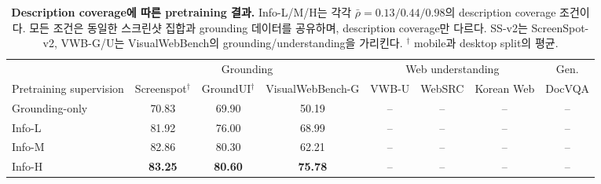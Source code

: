\begin{table}[t]
\centering
\small
\begin{tabular}{lccccccc}
\toprule
& \multicolumn{3}{c}{Grounding} & \multicolumn{3}{c}{Web understanding} & \multicolumn{1}{c}{Gen.} \\
\cmidrule(lr){2-4}\cmidrule(lr){5-7}\cmidrule(lr){8-8}
Pretraining supervision & Screenspot$^{\dagger}$ & GroundUI$^{\dagger}$ & VisualWebBench-G & VWB-U & WebSRC & Korean Web & DocVQA \\
\midrule
Grounding-only & 70.83 & 69.90 & 50.19 & -- & -- & -- & -- \\
Info-L  & 81.92 & 76.00 & 68.99 & -- & -- & -- & -- \\
Info-M & 82.86 & 80.30 & 62.21 & -- & -- & -- & -- \\
Info-H & \textbf{83.25} & \textbf{80.60} & \textbf{75.78} & -- & -- & -- & -- \\
\bottomrule
\end{tabular}
\caption{\textbf{Description coverage에 따른 pretraining 결과.}
Info-L/M/H는 각각 $\bar\rho=0.13/0.44/0.98$의 description coverage 조건이다.
모든 조건은 동일한 스크린샷 집합과 grounding 데이터를 공유하며,
description coverage만 다르다. SS-v2는 ScreenSpot-v2,
VWB-G/U는 VisualWebBench의 grounding/understanding을 가리킨다.
$^{\dagger}$ mobile과 desktop split의 평균.}
\label{tab:main}
\end{table}